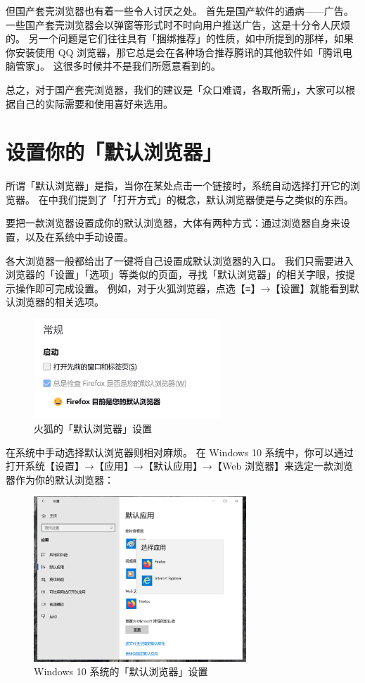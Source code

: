 但国产套壳浏览器也有着一些令人讨厌之处。
首先是国产软件的通病——广告。
一些国产套壳浏览器会以弹窗等形式时不时向用户推送广告，这是十分令人厌烦的。
另一个问题是它们往往具有「捆绑推荐」的性质，如中所提到的那样，如果你安装使用 QQ 浏览器，那它总是会在各种场合推荐腾讯的其他软件如「腾讯电脑管家」。
这很多时候并不是我们所愿意看到的。

总之，对于国产套壳浏览器，我们的建议是「众口难调，各取所需」，大家可以根据自己的实际需要和使用喜好来选用。

\section{设置你的「默认浏览器」}

所谓「默认浏览器」是指，当你在某处点击一个链接时，系统自动选择打开它的浏览器。
在中我们提到了「打开方式」的概念，默认浏览器便是与之类似的东西。

要把一款浏览器设置成你的默认浏览器，大体有两种方式：通过浏览器自身来设置，以及在系统中手动设置。

各大浏览器一般都给出了一键将自己设置成默认浏览器的入口。
我们只需要进入浏览器的「设置」「选项」等类似的页面，寻找「默认浏览器」的相关字眼，按提示操作即可完成设置。
例如，对于火狐浏览器，点选【≡】→【设置】就能看到默认浏览器的相关选项。

\begin{figure}[htb!]
  \centering
  \includegraphics[width=7cm]{assets/Firefox_Default.png}
  \caption{火狐的「默认浏览器」设置}
  \label{Firefox_Default}
\end{figure}

在系统中手动选择默认浏览器则相对麻烦。
在 Windows 10 系统中，你可以通过打开系统【设置】→【应用】→【默认应用】→【Web 浏览器】来选定一款浏览器作为你的默认浏览器：

\begin{figure}[htb!]
  \centering
  \includegraphics[width=8cm]{assets/Win_10_Default_Browser.png}
  \caption{Windows 10 系统的「默认浏览器」设置}
  \label{Win_10_Default_Browser}
\end{figure}

